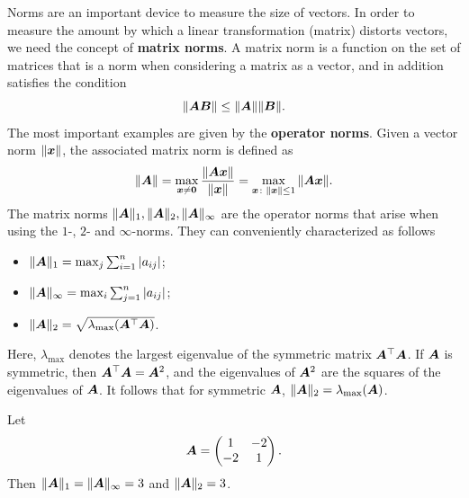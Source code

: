\documentclass[11pt,a4paper]{memoir}
\begin{document}
Norms are an important device to measure the size of vectors. In order to measure the amount by which a linear transformation (matrix) distorts vectors, we need the concept of
\strictpagecheck{}\textbf{matrix norms}. A matrix norm is a function on the set of matrices that is a norm when considering a matrix as a vector, and in addition satisfies the condition
\begin{equation*}
 \Vert {\bm{A}\bm{B}}\Vert\leq \Vert {\bm{A}}\Vert\Vert {\bm{B}}\Vert.
\end{equation*}
The most important examples are given by the \textbf{operator norms}. Given a vector norm $\Vert {\bm{x}}\Vert$, the associated matrix norm is defined as
\begin{equation*}
 \Vert {\bm{A}}\Vert = \max_{\bm{x}\neq \bm{0}} \frac{\Vert {\bm{A}\bm{x}}\Vert}{\Vert {\bm{x}}\Vert} = \max_{\bm{x}\colon \Vert {\bm{x}}\Vert\leq 1} \Vert {\bm{A}\bm{x}}\Vert.
\end{equation*}
The matrix norms $\Vert {\bm{A}}\Vert_1, \Vert {\bm{A}}\Vert_2, \Vert {\bm{A}}\Vert_\infty$ are the operator norms that arise when using the $1$-, $2$- and $\infty$-norms. They can conveniently characterized as follows
\begin{itemize}
 \item $\Vert {\bm{A}}\Vert_1 = \max_{j} \sum_{i=1}^n |a_{ij}|$;
 \item $\Vert {\bm{A}}\Vert_\infty = \max_{i} \sum_{j=1}^n |a_{ij}|$;
 \item $\Vert {\bm{A}}\Vert_2 = \sqrt{\lambda_{\mathrm{max}}(\bm{A}^{\top}\bm{A})}$.
\end{itemize}
Here, $\lambda_{\mathrm{max}}$ denotes the largest eigenvalue of the symmetric matrix $\bm{A}^{\top}\bm{A}$. If $\bm{A}$ is symmetric, then $\bm{A}^{\top}\bm{A}=\bm{A}^2$, and the eigenvalues of $\bm{A}^2$ are the squares of the eigenvalues of $\bm{A}$. It follows that for symmetric $\bm{A}$, $\Vert {\bm{A}}\Vert_2 = \lambda_{\mathrm{max}}(\bm{A})$.

\begin{example}
Let
\begin{equation*}
\bm{A} = \begin{pmatrix}
1 & -2\\
-2 & 1
\end{pmatrix}.
\end{equation*}
Then $\Vert {\bm{A}}\Vert_1 = \Vert {\bm{A}}\Vert_{\infty} = 3$ and $\Vert {\bm{A}}\Vert_2 = 3$.
\end{example}
\end{document}
